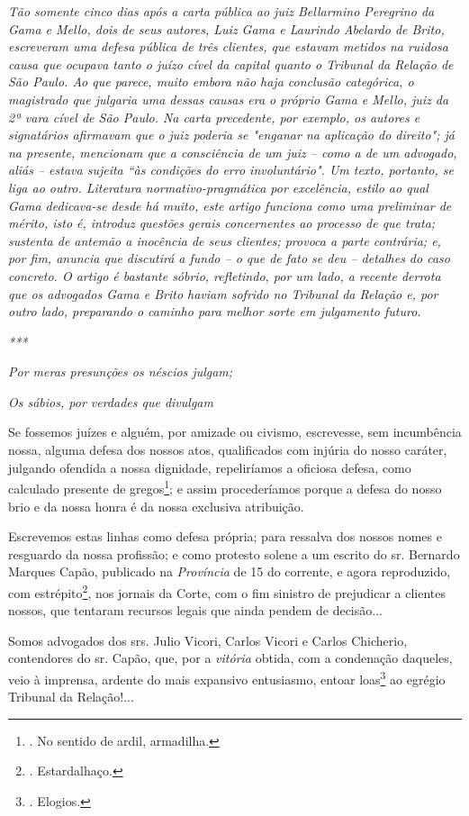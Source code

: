 \emph{Tão somente cinco dias após a carta pública ao juiz Bellarmino
Peregrino da Gama e Mello, dois de seus autores, Luiz Gama e Laurindo
Abelardo de Brito, escreveram uma defesa pública de três clientes, que
estavam metidos na ruidosa causa que ocupava tanto o juízo cível da
capital quanto o Tribunal da Relação de São Paulo. Ao que parece, muito
embora não haja conclusão categórica, o magistrado que julgaria uma
dessas causas era o próprio Gama e Mello, juiz da 2ª vara cível de São
Paulo. Na carta precedente, por exemplo, os autores e signatários
afirmavam que o juiz poderia se "enganar na aplicação do direito"; já na
presente, mencionam que a consciência de um juiz -- como a de um
advogado, aliás -- estava sujeita ``às condições do erro involuntário".
Um texto, portanto, se liga ao outro. Literatura normativo-pragmática
por excelência, estilo ao qual Gama dedicava-se desde há muito, este
artigo funciona como uma preliminar de mérito, isto é, introduz questões
gerais concernentes ao processo de que trata; sustenta de antemão a
inocência de seus clientes; provoca a parte contrária; e, por fim,
anuncia que discutirá a fundo -- o que de fato se deu -- detalhes do
caso concreto. O artigo é bastante sóbrio, refletindo, por um lado, a
recente derrota que os advogados Gama e Brito haviam sofrido no Tribunal
da Relação e, por outro lado, preparando o caminho para melhor sorte em
julgamento futuro.}

\emph{***}

\emph{Por meras presunções os néscios julgam;}

\emph{Os sábios, por verdades que divulgam}

Se fossemos juízes e alguém, por amizade ou civismo, escrevesse, sem
incumbência nossa, alguma defesa dos nossos atos, qualificados com
injúria do nosso caráter, julgando ofendida a nossa dignidade,
repeliríamos a oficiosa defesa, como calculado presente de
gregos\footnote{. No sentido de ardil, armadilha.}; e assim
procederíamos porque a defesa do nosso brio e da nossa honra é da nossa
exclusiva atribuição.

Escrevemos estas linhas como defesa própria; para ressalva dos nossos
nomes e resguardo da nossa profissão; e como protesto solene a um
escrito do sr. Bernardo Marques Capão, publicado na \emph{Província} de
15 do corrente, e agora reproduzido, com estrépito\footnote{.
  Estardalhaço.}, nos jornais da Corte, com o fim sinistro de prejudicar
a clientes nossos, que tentaram recursos legais que ainda pendem de
decisão...

Somos advogados dos srs. Julio Vicori, Carlos Vicori e Carlos Chicherio,
contendores do sr. Capão, que, por a \emph{vitória} obtida, com a
condenação daqueles, veio à imprensa, ardente do mais expansivo
entusiasmo, entoar loas\footnote{. Elogios.} ao egrégio Tribunal da
Relação!...


